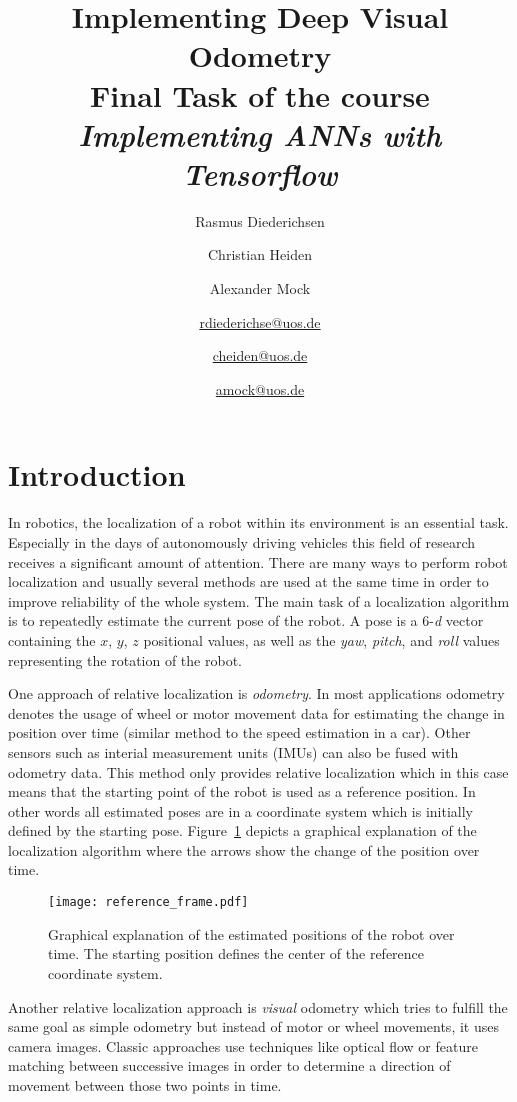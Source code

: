 \documentclass[a4paper,11pt]{article}
\title{Implementing Deep Visual Odometry\\{\large Final Task of the course \emph{Implementing ANNs with Tensorflow}}}
\author{Rasmus Diederichsen \and Christian Heiden \and Alexander Mock\\\and \href{mailto:rdiederichse@uos.de}{rdiederichse@uos.de}\and \href{mailto:cheiden@uos.de}{cheiden@uos.de} \and \href{mailto:amock@uos.de}{amock@uos.de}}
\begin{document}
\maketitle


\section{Introduction}
\label{sec:introduction}
In robotics, the localization of a robot within its environment is an essential task. Especially in the days of autonomously driving vehicles this field of research receives a significant amount of attention. There are many ways to perform robot localization and usually several methods are used at the same time in order to improve reliability of the whole system. The main task of a localization algorithm is to repeatedly estimate the current pose of the robot. A pose is a 6-\emph{d} vector containing the $x$, $y$, $z$ positional values, as well as the \emph{yaw}, \emph{pitch}, and \emph{roll} values representing the rotation of the robot.

One approach of relative localization is \emph{odometry}. In most applications
odometry denotes the usage of wheel or motor movement data for estimating the
change in position over time (similar method to the speed estimation in a car).
Other sensors such as interial measurement units (IMUs) can also be fused with
odometry data. This method only provides relative localization which in this case means that the starting point of the robot is used as a reference position. In other words all estimated poses are in a coordinate system which is initially defined by the starting pose. Figure~\ref{fig:reference_frame} depicts a graphical explanation of the localization algorithm where the arrows show the change of the position over time.

\begin{figure}[tbh]
    \centering
    \texttt{[image: reference\_frame.pdf]}
    \caption{Graphical explanation of the estimated positions of the robot over time. The starting position defines the center of the reference coordinate system.}
    \label{fig:reference_frame}
\end{figure}

Another relative localization approach is \emph{visual} odometry which tries to
fulfill the same goal as simple odometry but instead of motor or wheel
movements, it uses camera images. Classic approaches use techniques like optical
flow or feature matching between successive images in order to determine a
direction of movement between those two points in time.
\end{document}

